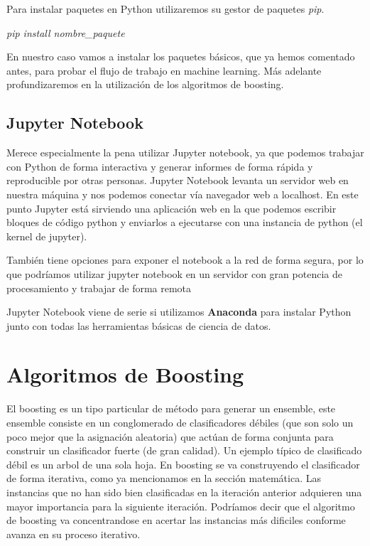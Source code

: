 Para instalar paquetes en Python utilizaremos su gestor de paquetes \textit{pip}.

\textit{pip install nombre\_paquete}

En nuestro caso vamos a instalar los paquetes básicos, que ya hemos comentado antes, para probar el flujo de trabajo en machine learning.  
Más adelante profundizaremos en la utilización de los algoritmos de boosting.  

\subsection{Jupyter Notebook}
Merece especialmente la pena utilizar Jupyter notebook, ya que podemos trabajar con Python de forma interactiva y generar informes de forma rápida y reproducible por otras personas.  
Jupyter Notebook levanta un servidor web en nuestra máquina y nos podemos conectar vía navegador web a localhost. En este punto Jupyter está sirviendo una aplicación web en la que podemos escribir bloques de código python y enviarlos a ejecutarse con una instancia de python (el kernel de jupyter).

También tiene opciones para exponer el notebook a la red de forma segura, por lo que podríamos utilizar jupyter notebook en un servidor con gran potencia de procesamiento y trabajar de forma remota

Jupyter Notebook viene de serie si utilizamos \textbf{Anaconda} para instalar Python junto con todas las herramientas básicas de ciencia de datos.

\section{Algoritmos de Boosting}

El boosting es un tipo particular de método para generar un ensemble, este ensemble consiste en un conglomerado de  clasificadores débiles (que son solo un poco mejor que la asignación aleatoria) que actúan de forma conjunta para construir un clasificador fuerte (de gran calidad). Un ejemplo típico de clasificado débil es un arbol de una sola hoja.  
En boosting se va construyendo el clasificador de forma iterativa, como ya mencionamos en la sección matemática.  
Las instancias que no han sido bien clasificadas en la iteración anterior adquieren una mayor importancia para la siguiente iteración. Podríamos decir que el algoritmo de boosting va concentrandose en acertar las instancias más dificiles conforme avanza en su proceso iterativo.  


